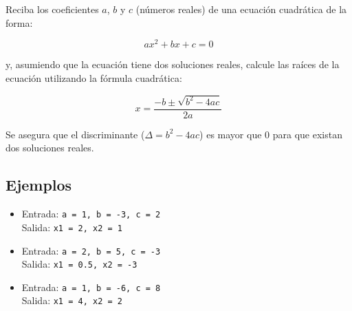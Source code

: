 Reciba los coeficientes \(a\), \(b\) y \(c\) (números reales) de una ecuación cuadrática de la forma:

\[
ax^2 + bx + c = 0
\]

y, asumiendo que la ecuación tiene dos soluciones reales, calcule las raíces de la ecuación utilizando la fórmula cuadrática:

\[
x = \frac{-b \pm \sqrt{b^2 - 4ac}}{2a}
\]

Se asegura que el discriminante (\(\Delta = b^2 - 4ac\)) es mayor que 0 para que existan dos soluciones reales.

\subsection*{Ejemplos}
\begin{itemize}
    \item Entrada: \texttt{a = 1, b = -3, c = 2}\\
          Salida: \texttt{x1 = 2, x2 = 1}
    \item Entrada: \texttt{a = 2, b = 5, c = -3}\\
          Salida: \texttt{x1 = 0.5, x2 = -3}
    \item Entrada: \texttt{a = 1, b = -6, c = 8}\\
          Salida: \texttt{x1 = 4, x2 = 2}
\end{itemize}
